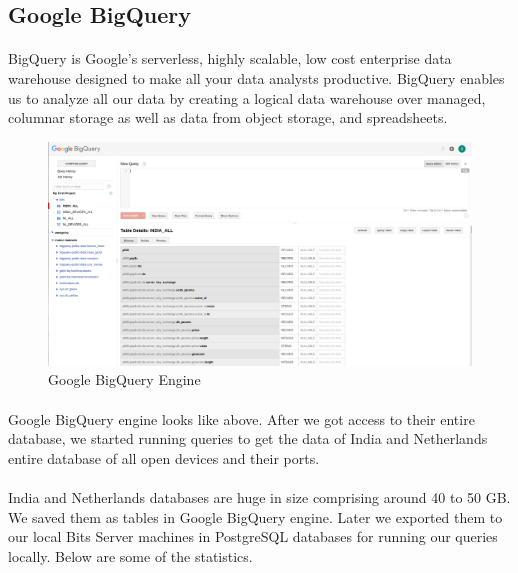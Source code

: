 \documentclass{report}
\begin{document}
\subsection{Google BigQuery}
\paragraph{}
BigQuery is Google's serverless, highly scalable, low cost enterprise data warehouse designed to make all your data analysts productive. BigQuery enables us to analyze all our data by creating a logical data warehouse over managed, columnar storage as well as data from object storage, and spreadsheets.

\begin{figure}[h!]
\centering
\caption{Google BigQuery Engine}
\includegraphics[scale=0.2]{google_big_query}
\end{figure}

\paragraph{}
Google BigQuery engine looks like above. After we got access to their entire database, we started running queries to get the data of India and Netherlands entire database of all open devices and their ports.

\paragraph{}
India and Netherlands databases are huge in size comprising around 40 to 50 GB. We saved them as tables in Google BigQuery engine. Later we exported them to our local Bits Server machines in PostgreSQL databases for running our queries locally. Below are some of the statistics.
\end{document}

